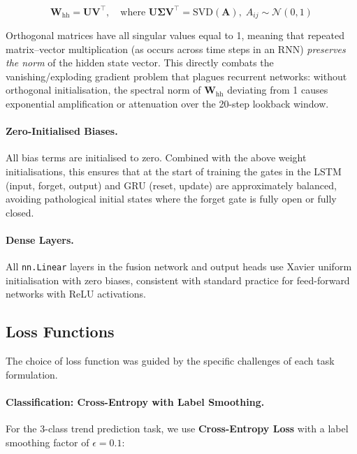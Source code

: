 \begin{equation}
  \mathbf{W}_{\text{hh}} = \mathbf{U}\mathbf{V}^\top, \quad
  \text{where } \mathbf{U}\boldsymbol{\Sigma}\mathbf{V}^\top =
  \text{SVD}(\mathbf{A}),\; A_{ij} \sim \mathcal{N}(0, 1)
\end{equation}

Orthogonal matrices have all singular values equal to 1, meaning that repeated
matrix--vector multiplication (as occurs across time steps in an RNN)
\emph{preserves the norm} of the hidden state vector.  This directly combats the
vanishing/exploding gradient problem that plagues recurrent networks: without
orthogonal initialisation, the spectral norm of $\mathbf{W}_{\text{hh}}$
deviating from 1 causes exponential amplification or attenuation over the
20-step lookback window.

\paragraph{Zero-Initialised Biases.}
All bias terms are initialised to zero.  Combined with the above weight
initialisations, this ensures that at the start of training the gates in the
LSTM (input, forget, output) and GRU (reset, update) are approximately
balanced, avoiding pathological initial states where the forget gate is fully
open or fully closed.

\paragraph{Dense Layers.}
All \texttt{nn.Linear} layers in the fusion network and output heads use Xavier
uniform initialisation with zero biases, consistent with standard practice for
feed-forward networks with ReLU activations.

\subsection{Loss Functions}
\label{sec:loss-functions}

The choice of loss function was guided by the specific challenges of each task
formulation.

\paragraph{Classification: Cross-Entropy with Label Smoothing.}
For the 3-class trend prediction task, we use \textbf{Cross-Entropy Loss} with
a label smoothing factor of $\epsilon = 0.1$:

